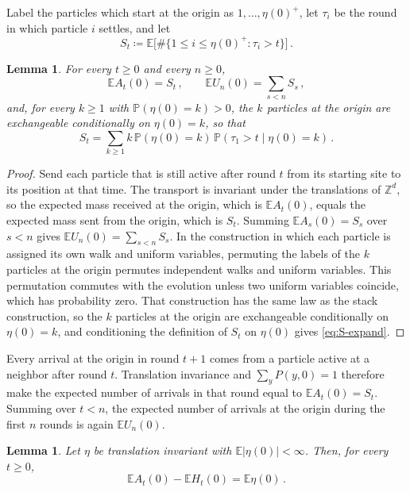 \documentclass[11pt]{amsart}
\theoremstyle{plain}
\newtheorem{lemma}[theorem]{Lemma}
\theoremstyle{definition}
\newcommand{\Z}{\mathbb{Z}}
\newcommand{\E}{\mathbb{E}}
\renewcommand{\P}{\mathbb{P}}
\begin{document}
Label the particles which start at the origin as
$1,\ldots,\eta(0)^+$, let $\tau_i$ be the round in which particle $i$ settles,
and let
\[
	S_t\coloneqq\E\bigl[\#\{1\leq i\leq\eta(0)^+:\tau_i>t\}\bigr]\,.
\]

\begin{lemma}\label{lem:transport}
	For every $t\geq0$ and every $n\geq0$,
	\begin{equation}\label{eq:transport}
		\E A_t(0)=S_t\,,
		\qquad
		\E U_n(0)=\sum_{s<n}S_s\,,
	\end{equation}
	and, for every $k\geq1$ with $\P(\eta(0)=k)>0$, the $k$ particles at the
	origin are exchangeable conditionally on $\eta(0)=k$, so that
	\begin{equation}\label{eq:S-expand}
		S_t=\sum_{k\geq1}k\,\P(\eta(0)=k)\,\P(\tau_1>t\mid\eta(0)=k)\,.
	\end{equation}
\end{lemma}

\begin{proof}
	Send each particle that is still active after round $t$ from its starting
	site to its position at that time. The transport is invariant under the
	translations of $\Z^d$, so the expected mass received at the origin, which is
	$\E A_t(0)$, equals the expected mass sent from the origin, which is $S_t$.
	Summing $\E A_s(0)=S_s$ over $s<n$ gives $\E U_n(0)=\sum_{s<n}S_s$. In the
	construction in which each particle is assigned its own walk and uniform
	variables, permuting the labels of the $k$ particles at the origin permutes
	independent walks and uniform variables. This permutation commutes with the
	evolution unless two uniform variables coincide, which has probability zero.
	That construction has the same law as the stack construction, so the $k$
	particles at the origin are exchangeable conditionally on $\eta(0)=k$, and
	conditioning the definition of $S_t$ on $\eta(0)$ gives \eqref{eq:S-expand}.
\end{proof}

Every arrival at the origin in round $t+1$ comes from a particle active at a
neighbor after round $t$. Translation invariance and $\sum_yP(y,0)=1$ therefore
make the expected number of arrivals in that round equal to $\E A_t(0)=S_t$.
Summing over $t<n$, the expected number of arrivals at the origin during the
first $n$ rounds is again $\E U_n(0)$.

\begin{lemma}\label{lem:activity-holes}
	Let $\eta$ be translation invariant with $\E|\eta(0)|<\infty$.
	Then, for every $t\geq0$,
	\begin{equation}\label{eq:activity-holes}
		\E A_t(0)-\E H_t(0)=\E\eta(0)\,.
	\end{equation}
\end{lemma}
\end{document}
